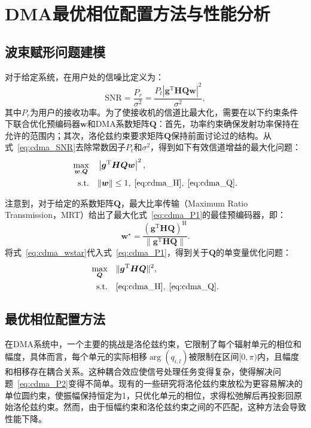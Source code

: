 \section{DMA最优相位配置方法与性能分析}\label{sec:cdma_opt}

\subsection{波束赋形问题建模}

对于给定系统，在用户处的信噪比定义为：
\begin{equation}\label{eq:cdma_SNR}
	\mathrm{SNR}=\frac{P_{r}}{\sigma^2}
	=\frac{P_{t} \left| \bm{g}^\mathrm{T} \bm{HQw} \right|^2} {\sigma^2},
\end{equation}
其中$P_{r}$为用户的接收功率。为了使接收机的信道比最大化，需要在以下约束条件下联合优化预编码器$\bm{w}$和DMA系数矩阵$\bm{Q}$：首先，功率约束确保发射功率保持在允许的范围内；其次，洛伦兹约束要求矩阵$\bm{Q}$保持前面讨论过的结构。从式~\eqref{eq:cdma_SNR}去除常数因子$P_{t}$和$\sigma^2$，得到如下有效信道增益的最大化问题：
\begin{align}\label{eq:cdma_P1}
	\max_{\bm{w}, \bm{Q}} \quad & \left| \bm{g}^\mathrm{T} \bm{HQw} \right|^2, \\ 
	\text{s.t.} \quad &\|\bm{w}\| \leq 1,\;\eqref{eq:cdma_H},\;\eqref{eq:cdma_Q}.
\end{align}

注意到，对于给定的系数矩阵$\bm Q$，最大比率传输（Maximum Ratio Transmission，MRT）给出了最大化式~\eqref{eq:cdma_P1}的最佳预编码器，即：
\begin{equation}\label{eq:cdma_wstar}
	\bm{w}^\star = \frac{(\bm{g}^\mathrm{T} \bm{HQ})^\mathrm{H}} {\|\bm{g}^\mathrm{T} \bm{HQ}\|}.
\end{equation}
将式~\eqref{eq:cdma_wstar}代入式~\eqref{eq:cdma_P1}，得到关于$\bm{Q}$的单变量优化问题：
\begin{align}\label{eq:cdma_P2}
	\max_{\bm{Q}} \quad & \|\bm{g}^\mathrm{T} \bm{HQ}\|^2, \\
	\text{s.t.} \quad &\eqref{eq:cdma_H},\;\eqref{eq:cdma_Q}.
\end{align}


\subsection{最优相位配置方法}\label{sec:cdma_best_phase_align}

在DMA系统中，一个主要的挑战是洛伦兹约束，它限制了每个辐射单元的相位和幅度，具体而言，每个单元的实际相移$\arg(q_{i,l})$被限制在区间$[0,\pi)$内，且幅度和相移存在耦合关系。这种耦合效应使信号处理任务变得复杂，使得解决问题~\eqref{eq:cdma_P2}变得不简单。现有的一些研究将洛伦兹约束放松为更容易解决的单位圆约束\cite{zhang2021beam, zhang2022beam}，使振幅保持恒定为1，只优化单元的相位，求得松弛解后再投影回原始洛伦兹约束。然而，由于恒幅约束和洛伦兹约束之间的不匹配，这种方法会导致性能下降。

